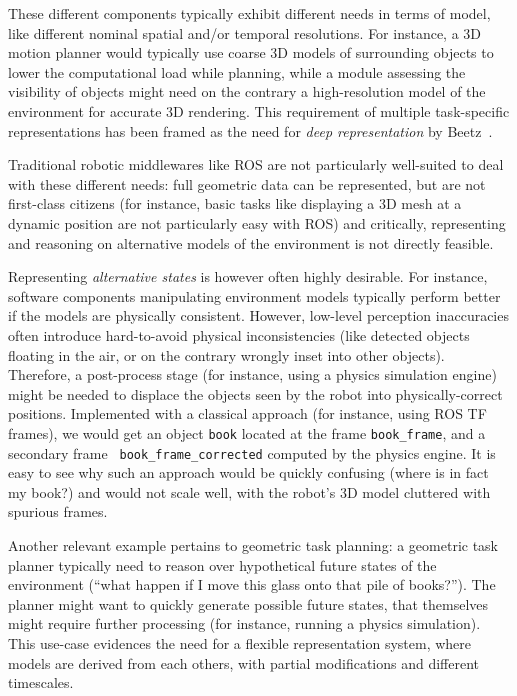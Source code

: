 \documentclass[letterpaper, 10 pt, conference]{ieeeconf}  %
\newcommand{\eg}{e.g.,\xspace}
\begin{document}
These different components typically exhibit different needs in terms of model,
like different nominal spatial and/or temporal resolutions. For instance, a 3D
motion planner would typically use coarse 3D models of surrounding objects to
lower the computational load while planning, while a module assessing the
visibility of objects might need on the contrary a high-resolution model of the
environment for accurate 3D rendering. This requirement of multiple
task-specific representations has been framed as the need for \emph{deep
representation} by Beetz~\cite{beetz2010towards}.


Traditional robotic middlewares like ROS are not particularly well-suited to
deal with these different needs: full geometric data can be represented, but are not
first-class citizens (for instance, basic tasks like displaying a 3D mesh at a dynamic
position are not particularly easy with ROS) and critically, representing and reasoning
on alternative models of the environment is not directly feasible.

Representing \emph{alternative states} is however often highly desirable. For instance,
software components manipulating environment models typically perform better if
the models are physically consistent. However, low-level perception inaccuracies
often introduce hard-to-avoid physical inconsistencies (like
detected objects floating in the air, or on the contrary wrongly inset into
other objects). Therefore, a post-process stage (for instance, using a physics
simulation engine) might be needed to displace the objects seen
by the robot into physically-correct positions. Implemented with a classical
approach (for instance, using ROS TF frames), we would get an object {\tt book}
located at the frame {\tt book\_frame}, and a secondary frame {\tt
book\_frame\_corrected} computed by the physics engine. It is easy to see why
such an approach would be quickly confusing (where is in fact my book?) and would not
scale well, with the robot's 3D model cluttered with spurious frames.

Another relevant example pertains to geometric task planning: a geometric task
planner typically need to reason over hypothetical future states of the
environment (``what happen if I move this glass onto that pile of books?'').
The planner might want to quickly generate possible future states, that
themselves might require further processing (for instance, running a physics
simulation). This use-case evidences the need for a flexible representation
system, where models are derived from each others, with partial modifications
and different timescales.
\end{document}
